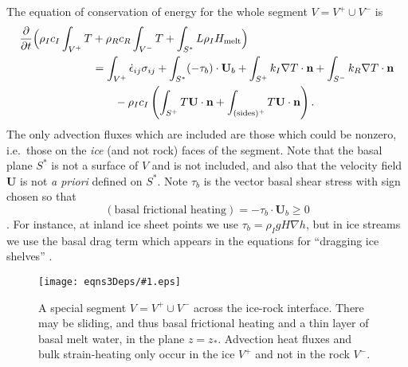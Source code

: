 \documentclass[12pt,final]{amsart}%
\theoremstyle{plain}
\theoremstyle{definition}
\theoremstyle{remark}
\newcommand{\regfigure}[2]{\texttt{[image: eqns3Deps/\#1.eps]}}
\newcommand{\ddt}[1]{\ensuremath{\frac{\partial #1}{\partial t}}}
\def\eps{\epsilon}
\newcommand{\grad}{\nabla}
\newcommand{\nhat}{\mathbf{n}}
\newcommand{\bU}{{\mathbf{U}}}
\begin{document}
The equation of conservation of energy for the whole segment $V=V^+\cup V^-$ is
\begin{align}
\ddt{}\Big(\rho_I c_I \int_{V^+} T &+ \rho_R c_R \int_{V^-} T + \int_{S^\ast} L \rho_I H_{\text{melt}}\Big) \label{acrossINTERFACE} \\
    &= \int_{V^+} \dot \eps_{ij} \sigma_{ij} + \int_{S^\ast} (-\tau_b) \cdot \bU_b + \int_{S^+} k_I \grad T \cdot \nhat + \int_{S^-} k_R \grad T \cdot \nhat \notag\\
    &\qquad - \rho_I c_I\left(\int_{S^+} T \bU\cdot \nhat + \int_{(\text{sides})^+} T \bU\cdot \nhat\right).\notag
\end{align}
The only advection fluxes which are included are those which could be nonzero, i.e.~those on the \emph{ice} (and not rock) faces of the segment.  Note that the basal plane $S^\ast$ is not a surface of $V$ and is not included, and also that the velocity field $\bU$ is not \emph{a priori} defined on $S^\ast$.  Note $\tau_b$ is the vector basal shear stress with sign chosen so that
    $$(\text{basal frictional heating}) = -\tau_b \cdot \bU_b \ge 0$$
\citep[chapter 10]{Paterson}.  For instance, at inland ice sheet points we use $\tau_b = \rho_I g H \grad h$, but in ice streams we use the basal drag term which appears in the equations for ``dragging ice shelves'' \citep[i.e.~the equations from][]{MacAyeal}.

\begin{figure}[ht]
\regfigure{interfacesegment}{3.5}
\vspace{-0.1in}
\caption{A special segment $V=V^+\cup V^-$ across the ice-rock interface.  There may be sliding, and thus basal frictional heating and a thin layer of basal melt water, in the plane $z=z_\ast$.  Advection heat fluxes and bulk strain-heating only occur in the ice $V^+$ and not in the rock $V^-$.}
\label{fig:segINTERFACE}
\vspace{-0.1in}
\end{figure}
\end{document}
